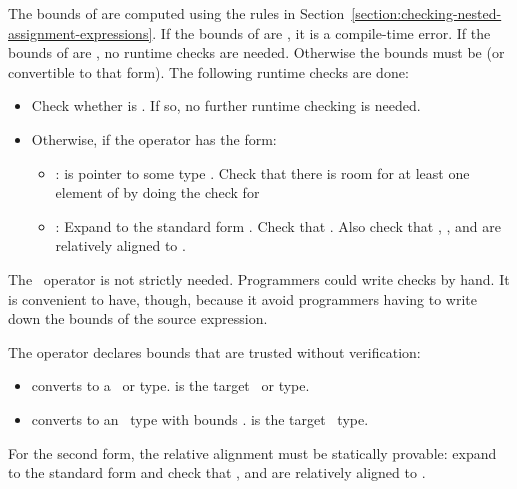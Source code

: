 The bounds of  are computed
using the rules in Section~\ref{section:checking-nested-assignment-expressions}.
If the bounds of  are \boundsunknown, it is a compile-time error. 
If the bounds of  are \boundsany, no runtime checks are needed.
Otherwise the bounds must be  (or convertible to that form).
The following runtime checks are done:
\begin{itemize}
\item Check whether  is .  If so, no further runtime checking
is needed.
\item Otherwise, if the operator has the form:
\begin{itemize}
\item
  :  is pointer to some type .
  Check that there is room for at least one element of  by doing
  the check for 
\item
  :
   Expand  to the standard
   form .
   Check that   \code{<=}  \code{&&}  \code{<=} .
   Also check that , , and  are relatively aligned to .
\end{itemize}
\end{itemize}
The \dynamicboundscast\ operator is not strictly needed.
Programmers could write checks by hand. It is convenient to have, though,
because it avoid programmers having to write down the bounds of the source expression.

The operator  declares bounds that are trusted
without verification:
\begin{itemize}
\item
  converts  to a \ptr\ or \code{*} type.  is the target \ptr\ or \code{*} type.
\item
  converts  to an \arrayptr\ type with bounds .   is the
  target \arrayptr\ type.
\end{itemize}
For the second form, the relative alignment must be statically
provable: expand  to the standard form
 and check
that ,  and  are relatively aligned to .

